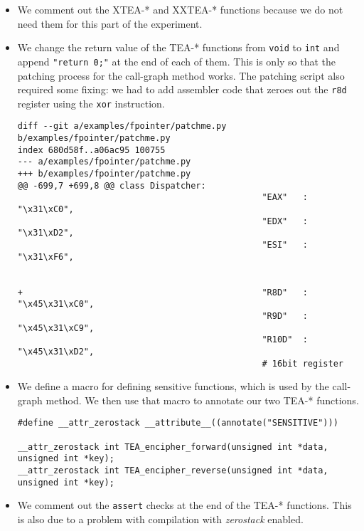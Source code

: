 \documentclass[a4paper,10pt,openright]{memoir}
\newcommand{\term}[1]{\textit{#1}}
\newcommand{\code}[1]{\texttt{#1}}
\begin{document}
\begin{itemize}

\item We comment out the XTEA-* and XXTEA-* functions because we do not 
need them for this part of the experiment.

\item We change the return value of the TEA-* functions from 
\code{void} to \code{int} and append \code{"return 0;"} at the end of 
each of them. This is only so that the patching process for the 
call-graph method works. The patching script also required some fixing: 
we had to add assembler code that zeroes out the \code{r8d} register 
using the \code{xor} instruction.

\begin{verbatim}
diff --git a/examples/fpointer/patchme.py b/examples/fpointer/patchme.py
index 680d58f..a06ac95 100755
--- a/examples/fpointer/patchme.py
+++ b/examples/fpointer/patchme.py
@@ -699,7 +699,8 @@ class Dispatcher:
                                                "EAX"   :       "\x31\xC0",
                                                "EDX"   :       "\x31\xD2",
                                                "ESI"   :       "\x31\xF6",
                                                

+                                               "R8D"   :       "\x45\x31\xC0", 
                                                "R9D"   :       "\x45\x31\xC9",
                                                "R10D"  :       "\x45\x31\xD2",
                                                # 16bit register		
\end{verbatim}

\item We define a macro for defining sensitive functions, which is used 
by the call-graph method. We then use that macro to annotate our two 
TEA-* functions.

\begin{verbatim}
#define __attr_zerostack __attribute__((annotate("SENSITIVE")))

__attr_zerostack int TEA_encipher_forward(unsigned int *data, unsigned int *key);
__attr_zerostack int TEA_encipher_reverse(unsigned int *data, unsigned int *key);
\end{verbatim}

\item We comment out the \code{assert} checks at the end of the TEA-* 
functions. This is also due to a problem with compilation with 
\term{zerostack} enabled.

\end{itemize}
\end{document}
